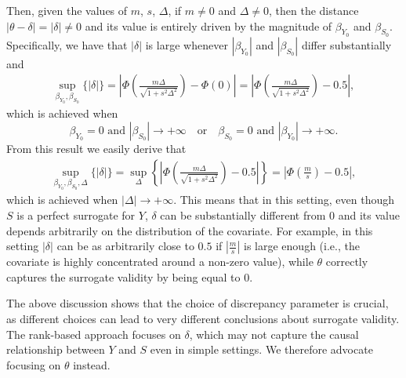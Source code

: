 \documentclass[12pt]{article}
\begin{document}
Then, given the values of \(m\), \(s\), \(\Delta\), if \(m \neq 0\) and \(\Delta \neq 0\), then the distance \( |\theta - \delta| = |\delta| \neq 0\) and its value is entirely driven by the magnitude of \(\beta_{Y_{0}}\) and \(\beta_{S_{0}}\). Specifically, we have that \(|\delta|\) is large whenever \(| \beta_{Y_{0}} |\) and \(| \beta_{S_{0}}| \) differ substantially and
\begin{align}
  \sup_{\beta_{Y_{0}}, \beta_{S_{0}}} \{ | \delta | \} = \left| \Phi \left( \frac{m \Delta}{\sqrt{1 + s^2 \Delta^2}} \right) - \Phi \left( 0 \right) \right| = \left| \Phi \left( \frac{m \Delta}{\sqrt{1 + s^2 \Delta^2}} \right) - 0.5 \right|,
\end{align}
which is achieved when
\begin{equation}
  \beta_{Y_{0}} = 0 \text{ and } | \beta_{S_{0}} | \to +\infty \quad \text{or} \quad \beta_{S_{0}} = 0 \text{ and } | \beta_{Y_{0}} | \to +\infty.
\end{equation}
From this result we easily derive that
\begin{align}
  \sup_{\beta_{Y_{0}}, \beta_{S_{0}}, \Delta} \{ | \delta | \} = \sup_{\Delta} \left\{ \left| \Phi \left( \frac{m \Delta}{\sqrt{1 + s^2 \Delta^2}} \right) - 0.5 \right| \right\} = \left| \Phi \left( \frac{m}{s} \right) - 0.5 \right|,
\end{align}
which is achieved when \( |\Delta| \to +\infty\). This means that in this setting, even though \(S\) is a perfect surrogate for \(Y\), \(\delta\) can be substantially different from \(0\) and its value depends arbitrarily on the distribution of the covariate. For example, in this setting \( |\delta| \) can be as arbitrarily close to \(0.5\) if \( | \frac{m}{s} | \) is large enough (i.e., the covariate is highly concentrated around a non-zero value), while \(\theta\) correctly captures the surrogate validity by being equal to \(0\).

The above discussion shows that the choice of discrepancy parameter is crucial, as different choices can lead to very different conclusions about surrogate validity. The rank-based approach focuses on \(\delta\), which may not capture the causal relationship between \(Y\) and \(S\) even in simple settings. We therefore advocate focusing on \(\theta\) instead.
\end{document}
